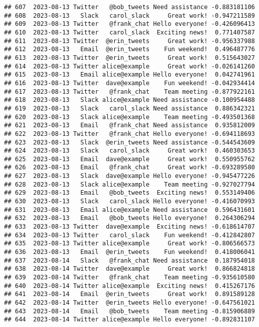 \documentclass[
]{article}
\begin{document}
\begin{verbatim}
## 607  2023-08-13 Twitter   @bob_tweets Need assistance -0.883181106
## 608  2023-08-13   Slack   carol_slack     Great work! -0.947211589
## 609  2023-08-13 Twitter   @frank_chat Hello everyone! -0.426096413
## 610  2023-08-13 Twitter   carol_slack  Exciting news!  0.771407587
## 611  2023-08-13 Twitter  @erin_tweets     Great work! -0.956337988
## 612  2023-08-13   Email  @erin_tweets    Fun weekend!  0.496487776
## 613  2023-08-13 Twitter  @erin_tweets     Great work!  0.515643027
## 614  2023-08-13 Twitter alice@example     Great work! -0.026141260
## 615  2023-08-13   Email alice@example Hello everyone!  0.042741961
## 616  2023-08-13 Twitter  dave@example    Fun weekend! -0.042934414
## 617  2023-08-13 Twitter   @frank_chat    Team meeting -0.877922161
## 618  2023-08-13   Slack alice@example Need assistance -0.100954488
## 619  2023-08-13   Slack   carol_slack Need assistance  0.886342321
## 620  2023-08-13   Slack alice@example    Team meeting -0.493501368
## 621  2023-08-13   Email   @frank_chat Need assistance  0.935812009
## 622  2023-08-13 Twitter   @frank_chat Hello everyone! -0.694118693
## 623  2023-08-13   Slack  @erin_tweets Need assistance -0.544543609
## 624  2023-08-13   Slack   carol_slack     Great work!  0.460303653
## 625  2023-08-13   Email  dave@example     Great work!  0.550955762
## 626  2023-08-13   Email   @frank_chat     Great work! -0.693289580
## 627  2023-08-13   Slack  dave@example Hello everyone! -0.945477226
## 628  2023-08-13   Slack alice@example    Team meeting -0.927027794
## 629  2023-08-13   Email   @bob_tweets  Exciting news!  0.553149406
## 630  2023-08-13   Slack   carol_slack Hello everyone! -0.416070993
## 631  2023-08-13   Email alice@example Need assistance  0.596431601
## 632  2023-08-13   Email   @bob_tweets Hello everyone!  0.264306294
## 633  2023-08-13 Twitter  dave@example  Exciting news! -0.618614707
## 634  2023-08-13 Twitter   carol_slack    Fun weekend! -0.412842807
## 635  2023-08-13 Twitter alice@example     Great work! -0.806566573
## 636  2023-08-13   Email  @erin_tweets    Fun weekend!  0.418006041
## 637  2023-08-14   Slack   @frank_chat Need assistance  0.187954018
## 638  2023-08-14 Twitter  dave@example     Great work!  0.866824818
## 639  2023-08-14 Twitter   @frank_chat    Team meeting -0.935610580
## 640  2023-08-14 Twitter alice@example  Exciting news!  0.415267176
## 641  2023-08-14   Email  @erin_tweets     Great work!  0.891589128
## 642  2023-08-14 Twitter  @erin_tweets Hello everyone! -0.647561021
## 643  2023-08-14   Email   @bob_tweets    Team meeting -0.815906889
## 644  2023-08-14 Twitter alice@example Hello everyone! -0.892831107

\end{verbatim}
\end{document}
